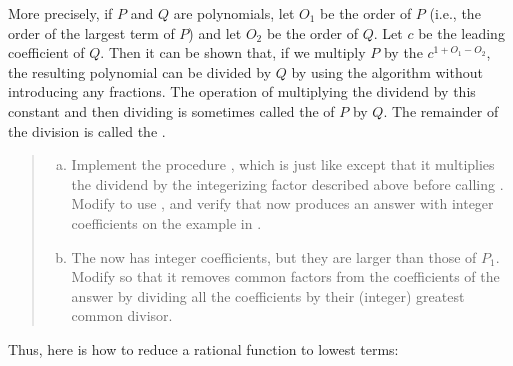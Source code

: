 \enlargethispage{\baselineskip}

More precisely, if \( P \) and \( Q \) are polynomials, let \( O_1 \) be the order of
\( P \) (i.e., the order of the largest term of \( P \)) and let \( O_2 \) be the
order of \( Q \).  Let \( c \) be the leading coefficient of \( Q \).  Then it can be
shown that, if we multiply \( P \) by the 
\( c^{1 + O_1 - O_2} \), the resulting polynomial can be divided by \( Q \) by
using the  algorithm without introducing any fractions.  The
operation of multiplying the dividend by this constant and then dividing is
sometimes called the  of \( P \) by \( Q \).  The remainder
of the division is called the .

\begin{quote}
\begin{enumerate}[a.]

\item
Implement the procedure , which is just like
 except that it multiplies the dividend by the
integerizing factor described above before calling .  Modify
 to use , and verify that
 now produces an answer with integer coefficients
on the example in .

\item
The  now has integer coefficients, but they are larger than those
of \( P_1 \).  Modify  so that it removes common factors from the
coefficients of the answer by dividing all the coefficients by their (integer)
greatest common divisor.

\end{enumerate}
\end{quote}

\noindent
Thus, here is how to reduce a rational function to lowest terms:

